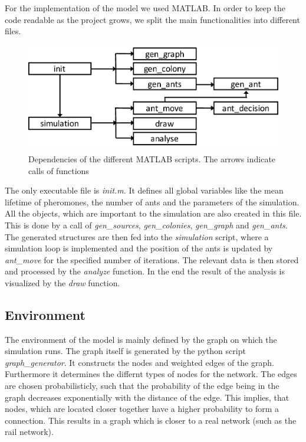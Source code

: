 For the implementation of the model we used MATLAB. In order to keep the code readable as the project grows, we split the main functionalities into different files.
\begin{figure}[H]
	\centering
	\includegraphics[scale=0.5]{Dependencies.pdf}
	\caption{Dependencies of the different MATLAB scripts. The arrows indicate calls of functions}
\end{figure}
The only executable file is \textit{init.m}. It defines all global variables like the mean lifetime of pheromones, the number of ants and the parameters of the simulation. All the objects, which are important to the simulation are also created in this file. This is done by a call of \textit{gen\_sources}, \textit{gen\_colonies}, \textit{gen\_graph} and \textit{gen\_ants}. The generated structures are then fed into the \textit{simulation} script, where a simulation loop is implemented and the position of the ants is updated by \textit{ant\_move} for the specified number of iterations. The relevant data is then stored and processed by the \textit{analyze} function. In the end the result of the analysis is visualized by the \textit{draw} function.
\subsection{Environment}
The environment of the model is mainly defined by the graph on which the simulation runs. 
The graph itself is generated by the python script \textit{graph\_generator}. It constructs the nodes and weighted edges of the graph. Furthermore it determines the differnt types of nodes for the network. The edges are chosen probabilisticly, such that the probability of the edge being in the graph decreases exponentially with the distance of the edge. This implies, that nodes, which are located closer together have a higher probability to form a connection. This results in a graph which is closer to a real network (such as the rail network).

